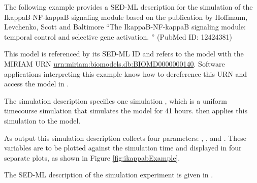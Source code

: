 The following example provides a SED-ML description for the simulation of the IkappaB-NF-kappaB signaling module based on the publication by Hoffmann, Levchenko, Scott and  Baltimore ``The IkappaB-NF-kappaB signaling module: temporal control and selective gene activation. '' (PubMed ID: 12424381)

This model is referenced by its SED-ML ID   and refers to the model with the MIRIAM URN \url{urn:miriam:biomodels.db:BIOMD0000000140}. 
Software applications interpreting this example know how to dereference this URN and access the model in \biom \citep{N+06}.

The simulation description specifies one simulation , which is a uniform timecourse simulation that simulates the model for 41 hours.  then applies this simulation to the model. 

As output this simulation description collects four parameters: , ,  and . These variables are to be plotted against the simulation time and displayed in four separate plots, as shown in Figure \ref{fig:ikappabExample}. 
%
%

The SED-ML description of the simulation experiment is given in .



